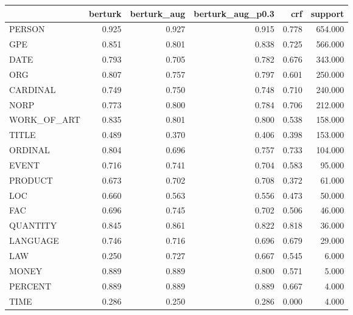 \begin{tabular}{lrrrrr}
\toprule
 & berturk & berturk_aug & berturk_aug_p0.3 & crf & support \\
\midrule
PERSON & 0.925 & 0.927 & 0.915 & 0.778 & 654.000 \\
GPE & 0.851 & 0.801 & 0.838 & 0.725 & 566.000 \\
DATE & 0.793 & 0.705 & 0.782 & 0.676 & 343.000 \\
ORG & 0.807 & 0.757 & 0.797 & 0.601 & 250.000 \\
CARDINAL & 0.749 & 0.750 & 0.748 & 0.710 & 240.000 \\
NORP & 0.773 & 0.800 & 0.784 & 0.706 & 212.000 \\
WORK_OF_ART & 0.835 & 0.801 & 0.800 & 0.538 & 158.000 \\
TITLE & 0.489 & 0.370 & 0.406 & 0.398 & 153.000 \\
ORDINAL & 0.804 & 0.696 & 0.757 & 0.733 & 104.000 \\
EVENT & 0.716 & 0.741 & 0.704 & 0.583 & 95.000 \\
PRODUCT & 0.673 & 0.702 & 0.708 & 0.372 & 61.000 \\
LOC & 0.660 & 0.563 & 0.556 & 0.473 & 50.000 \\
FAC & 0.696 & 0.745 & 0.702 & 0.506 & 46.000 \\
QUANTITY & 0.845 & 0.861 & 0.822 & 0.818 & 36.000 \\
LANGUAGE & 0.746 & 0.716 & 0.696 & 0.679 & 29.000 \\
LAW & 0.250 & 0.727 & 0.667 & 0.545 & 6.000 \\
MONEY & 0.889 & 0.889 & 0.800 & 0.571 & 5.000 \\
PERCENT & 0.889 & 0.889 & 0.889 & 0.667 & 4.000 \\
TIME & 0.286 & 0.250 & 0.286 & 0.000 & 4.000 \\
\bottomrule
\end{tabular}
